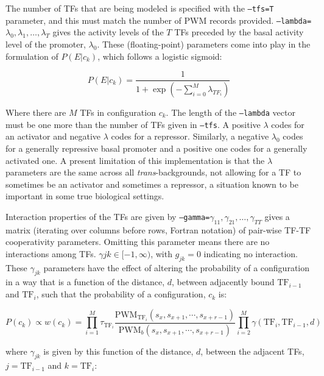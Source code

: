 \documentclass[11pt]{article}
\begin{document}
The number of TFs that are being modeled is specified with the \texttt{--tfs=T} parameter, and this must match the number of PWM records provided. \texttt{--lambda=}$\lambda_0,\lambda_1,\ldots,\lambda_{T}$ gives the activity levels of the $T$ TFs preceded by the basal activity level of the promoter, $\lambda_0$. These (floating-point) parameters come into play in the formulation of $P(E|c_k)$, which follows a logistic sigmoid:

\begin{displaymath}
P(E|c_k) = \frac{1}{1+\exp(-\sum_{i=0}^{M}\lambda_{TF_i})}
\end{displaymath}

\noindent Where there are $M$ TFs in configuration $c_k$. The length of the \texttt{--lambda} vector must be one more than the number of TFs given in \texttt{--tfs}. A positive $\lambda$ codes for an activator and negative $\lambda$ codes for a repressor. Similarly, a negative $\lambda_0$ codes for a generally repressive basal promoter and a positive one codes for a generally activated one. A present limitation of this implementation is that the $\lambda$ parameters are the same across all \emph{trans}-backgrounds, not allowing for a TF to sometimes be an activator and sometimes a repressor, a situation known to be important in some true biological settings.

Interaction properties of the TFs are given by \texttt{--gamma=}$\gamma_{11},\gamma_{21},\ldots,\gamma_{TT}$ gives a matrix (iterating over columns before rows, Fortran notation) of pair-wise TF-TF cooperativity parameters. Omitting this parameter means there are no interactions among TFs. $\gamma{jk} \in [-1,\infty)$, with $g_{jk} = 0$ indicating no interaction. These $\gamma_{jk}$ parameters have the effect of altering the probability of a configuration in a way that is a function of the distance, $d$, between adjacently bound $\mathrm{TF}_{i-1}$ and $\mathrm{TF}_i$, such that the probability of a configuration, $c_k$ is:

\begin{displaymath}
P(c_k) \propto w(c_k) =
\prod_{i=1}^{M}\tau_{\mathrm{TF}_{i}}\frac{\mathrm{PWM}_{\mathrm{TF}_{i}}(s_x,s_{x+1},\cdots,s_{x+r-1})}{\mathrm{PWM}_{b}(s_x,
 s_{x+1},\cdots,s_{x+r-1})}\prod_{i=2}^{M}\gamma(\mathrm{TF}_{i},\mathrm{TF}_{i-1},d)
\end{displaymath}

\noindent where $\gamma_{jk}$ is given by this function of the distance, $d$, between the adjacent TFs, $j = \mathrm{TF}_{i-1}$ and $k = \mathrm{TF}_{i}$:
\end{document}
